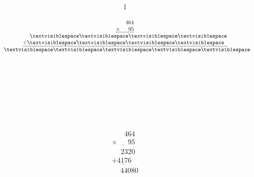 \begin{minipage}[t]{0.05\linewidth}
\begin{align*}\begin{array}{c}
1
\end{array}\end{align*}
\end{minipage}

\begin{minipage}[t]{0.3\linewidth}
\begin{align*}\begin{array}{c}
\phantom{
\times00
}
464\\
\underline{
\times
\phantom{
000
}
95
}\\
\phantom{
+0
}
\textvisiblespace
\textvisiblespace
\textvisiblespace
\textvisiblespace
\\
\underline{
+
\textvisiblespace
\textvisiblespace
\textvisiblespace
\textvisiblespace
\phantom0
}
\\
\phantom{+}
\textvisiblespace
\textvisiblespace
\textvisiblespace
\textvisiblespace
\textvisiblespace
\end{array}\end{align*}
\end{minipage}
\begin{minipage}[t]{0.05\linewidth}
\begin{align*}\begin{array}{c}
\textvisiblespace
\\
\textvisiblespace
\\
\textvisiblespace
\\
\textvisiblespace
\\
\textvisiblespace
\end{array}\end{align*}
\end{minipage}
\begin{minipage}[t]{0.05\linewidth}
\begin{align*}\begin{array}{c}
\textvisiblespace
\end{array}\end{align*}
\end{minipage}
\begin{minipage}[t]{0.3\linewidth}
\begin{align*}\begin{array}{c}
\phantom{
\times00
}
464\\
\underline{
\times
\phantom{
000
}
95
}\\
\phantom{
+0
}
2320
\\
\underline{
+
4176
\phantom0
}
\\
\phantom{+}
44080
\end{array}\end{align*}
\end{minipage}
